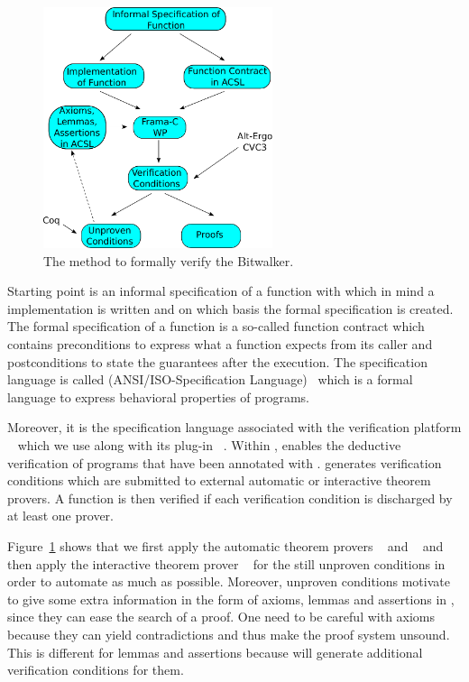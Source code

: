 \begin{figure}[hbt]
\centering
\includegraphics[width=0.60\textwidth]{figures/method-bitwalker.pdf}
\caption{\label{fig:method} The method to formally verify the Bitwalker.}
\end{figure}

Starting point is an informal specification of a function with which in mind
a implementation is written and on which basis the formal specification is created.
The formal specification of a function is a so-called function contract
which contains preconditions to express what a function expects from its caller
and postconditions to state the guarantees after the execution.
The specification language is called 
\acsl (ANSI\slash ISO-\isoc Specification Language)~\cite{acsl} 
which is a formal language to express behavioral properties of \isoc programs.

Moreover, it is the specification language associated with 
the verification platform \framac~\cite{FramaC}
which we use along with its plug-in \wpframac~\cite{wp}.
Within \framac, \wpframac enables the deductive verification of
\isoc programs that have been annotated with \acsl.
\wpframac generates verification conditions which are submitted to external 
automatic or interactive theorem provers.
A function is then verified if each verification condition is discharged
by at least one prover.

Figure~\ref{fig:method} shows that we first apply the automatic
theorem provers \altergo~\cite{alt-ergo} and \cvc~\cite{cvc3}
and then apply the
interactive theorem prover \coq~\cite{Coq}
for the still unproven conditions in order to automate as much as possible.
Moreover, unproven conditions motivate to give some extra information
in the form of axioms, lemmas and assertions in \acsl, 
since they can ease the search of a proof.
One need to be careful with axioms because they can yield contradictions
and thus make the proof system unsound.
This is different for lemmas and assertions
because \wpframac will generate additional verification conditions for them.

